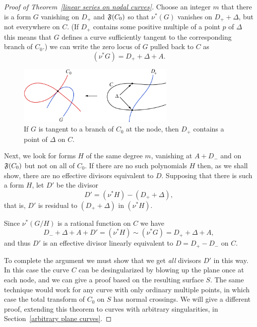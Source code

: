 \begin{proof}[Proof of Theorem~\ref{linear series on nodal curves}]
 Choose an integer $m$ 
that there is a form $G$ vanishing
 on  $D_{+}$ and $\adj(C_{0})$ so that
 $\nu^{*}(G)$ vanishes on $D_{+}+\Delta$, but not everywhere on $C$.
 (If $D_{+}$ contains some positive multiple of a point $p$ of $\Delta$
 this means that $G$ defines
 a curve sufficiently tangent to the corresponding branch of $C_0$.)
we can write the zero locus of $G$ pulled back to $C$ as
$$
(\nu^*G) = D_{+} + \Delta + A.
$$

\begin{figure}
\centerline {\includegraphics[width=3.0in]{"main/Fig14-3"}}
\caption{If $G$ is tangent to a branch of $C_{0}$ at the node, then
$D_{+}$ contains
a point of $\Delta$ on $C$.}
\label{Fig14.2}
\end{figure}

Next, we look for forms $H$ of the same degree $m$, vanishing at $A+D_{-}$
and on $\adj(C_{0})$
 but not on all of $C_0$. If there are no such polynomials $H$ then,
 as we shall show,
there are no effective divisors equivalent to $D$. Supposing that there
is such a form $H$, let $D'$ be the divisor
$$
D' = (\nu^*H) -( D_{+} + \Delta),
$$
that is, $D'$ is residual to $( D_{+} + \Delta)$ in $(\nu^*H)$.

Since $\nu^*(G/H)$ is a rational function on $C$ we have
$$
D_{-} +\Delta + A+ D' = (\nu^*H) \sim (\nu^*G) = D_{+} + \Delta + A,
$$
and thus $D'$ is an effective divisor linearly equivalent to $D =
D_{+}-D_{-}$ on $C$.

To complete the argument we must show that we get \emph{all} divisors $D'$
in this way.
In this case the curve $C$ can be desingularized by blowing up the plane
once at each node,
and we can give a proof based on the resulting surface $S$. The same
technique would work for any curve with only
%
%
%
ordinary multiple points, in which case the total transform of $C_{0}$ on
$S$ has normal crossings. We will give a different proof, extending this
theorem to curves with arbitrary singularities, in Section~\ref{arbitrary
plane curves}.


\end{proof}
